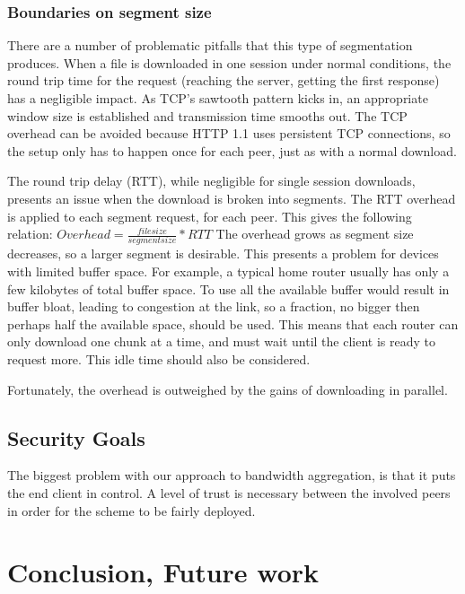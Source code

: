 \documentclass[12pt]{article}
\begin{document}
		\subsubsection{Boundaries on segment size}

			There are a number of problematic pitfalls that this type of segmentation produces. When a file is downloaded in one session under normal conditions, the round trip time for the request (reaching the server, getting the first response) has a negligible impact. As TCP's sawtooth pattern kicks in, an appropriate window size is established and transmission time smooths out. The TCP overhead can be avoided because HTTP 1.1 uses persistent TCP connections, so the setup only has to happen once for each peer, just as with a normal download.

			The round trip delay (RTT), while negligible for single session downloads, presents an issue when the download is broken into segments. The RTT overhead is applied to each segment request, for each peer. This gives the following relation:
			$Overhead = \frac{file size}{segment size} * RTT$
			The overhead grows as segment size decreases, so a larger segment is desirable. This presents a problem for devices with limited buffer space. For example, a typical home router usually has only a few kilobytes of total buffer space. To use all the available buffer would result in buffer bloat, leading to congestion at the link, so a fraction, no bigger then perhaps half the available space, should be used. This means that each router can only download one chunk at a time, and must wait until the client is ready to request more. This idle time should also be considered.

			Fortunately, the overhead is outweighed by the gains of downloading in parallel.

	\subsection{Security Goals}

		The biggest problem with our approach to bandwidth aggregation, is that it puts the end client in control. A level of trust is necessary between the involved peers in order for the scheme to be fairly deployed. 

\section{Conclusion, Future work}


\listoftodos
\end{document}

